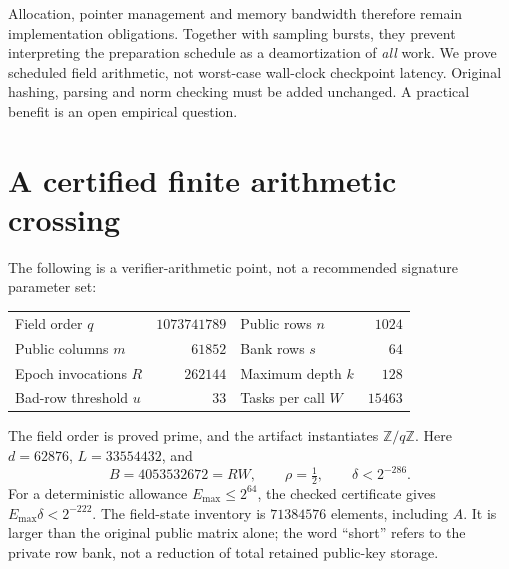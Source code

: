 \documentclass[11pt,letterpaper]{article}
\theoremstyle{definition}
\newcommand{\Emax}{E_{\max}}
\begin{document}
Allocation, pointer management and memory bandwidth therefore remain implementation obligations. Together with sampling bursts, they prevent interpreting the preparation schedule as a deamortization of \emph{all} work. We prove scheduled field arithmetic, not worst-case wall-clock checkpoint latency. Original hashing, parsing and norm checking must be added unchanged. A practical benefit is an open empirical question.

\section{A certified finite arithmetic crossing}
\label{sec:example}
The following is a verifier-arithmetic point, not a recommended signature parameter set:
\begin{center}
\begin{tabular}{@{}lrlr@{}}
\toprule
Field order $q$ & $1073741789$ & Public rows $n$ & $1024$\\
Public columns $m$ & $61852$ & Bank rows $s$ & $64$\\
Epoch invocations $R$ & $262144$ & Maximum depth $k$ & $128$\\
Bad-row threshold $u$ & $33$ & Tasks per call $W$ & $15463$\\
\bottomrule
\end{tabular}
\end{center}
The field order is proved prime, and the artifact instantiates $\mathbb Z/q\mathbb Z$. Here $d=62876$, $L=33554432$, and
\[
 B=4053532672=RW,\qquad \rho=\tfrac12,\qquad \delta<2^{-286}.
\]
For a deterministic allowance $\Emax\le2^{64}$, the checked certificate gives $\Emax\delta<2^{-222}$. The field-state inventory is $71384576$ elements, including $A$. It is larger than the original public matrix alone; the word ``short'' refers to the private row bank, not a reduction of total retained public-key storage.
\end{document}
